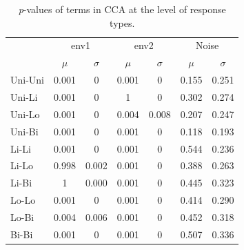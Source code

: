 		\begin{table}[h!] 
				 
				\small
				\caption{\textit{p}-values of terms in CCA at the level of response types.}
				\centering
				
				\begin{tabular}{@{}lcccccc@{}}
					\toprule
					& \multicolumn{2}{c}{env1} & \multicolumn{2}{c}{env2} & \multicolumn{2}{c}{Noise}\\\cmidrule(l){2-3} \cmidrule(l){4-5} \cmidrule(l){6-7}
					& $\mu$ & $\sigma$ & $\mu$ & $\sigma$ & $\mu$ & $\sigma$\\
					\hline
					Uni-Uni& 0.001 & 0 & 0.001 & 0 & 0.155 & 0.251\\ 
					Uni-Li& 0.001 & 0 & 1 & 0 & 0.302 & 0.274\\ 
					Uni-Lo& 0.001 & 0 & 0.004 & 0.008 & 0.207 & 0.247\\ 
					Uni-Bi& 0.001 & 0 & 0.001 & 0 & 0.118 & 0.193\\ 
					Li-Li & 0.001 & 0 & 0.001 & 0 & 0.544 & 0.236\\ 
					Li-Lo & 0.998 & 0.002 & 0.001 & 0 & 0.388 & 0.263\\ 
					Li-Bi & 1 & 0.000 & 0.001 & 0 & 0.445 & 0.323\\ 
					Lo-Lo & 0.001 & 0 & 0.001 & 0 & 0.414 & 0.290\\ 
					Lo-Bi & 0.004 & 0.006 & 0.001 & 0 & 0.452 & 0.318\\ 
					Bi-Bi & 0.001 & 0 & 0.001 & 0 & 0.507 & 0.336 \\ 
					\toprule
				\end{tabular}
			
				\label{tab:ccasm2}
			
		\end{table}
		
		\vspace{10em}
		

